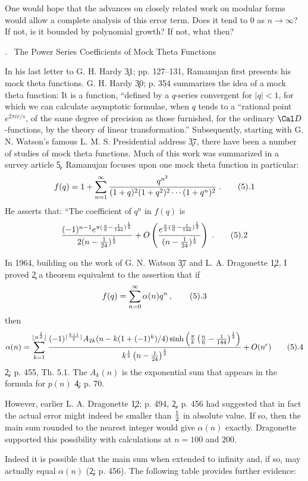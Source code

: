 One would hope that the advances on closely related work on modular
forms would allow a complete analysis of this error term.  Does it
tend to $0$ as $n \to \infty$?  If not, is it bounded by polynomial
growth?  If not, what then?

. \ The Power Series Coefficients of Mock Theta Functions
\endsubhead

In his last letter to G. H. Hardy \c{31; pp. 127--131}, Ramanujan
first presents his mock theta functions.  G. H. Hardy \c{30; p. 354}
summarizes the idea of a mock theta function: It is a function,
``defined by a $q$-series convergent for $|q| < 1$, for which we 
can calculate asymptotic formulae, when $q$ tends to a ``rational
point $e^{2\pi ir/s}$, of the same degree of precision as those
furnished, for the ordinary $\D$-functions, by the theory of linear
transformation.''  Subsequently, starting with G. N. Watson's 
famous L. M. S. Presidential address \c{37}, there have been a
number of studies of mock theta functions.  Much of this work was
summarized in a survey article \c5.  Ramanujan focuses upon one mock 
theta function in particular:
$$
	f(q) = 1 + \sum_{n=1}^{\infty} \fr{q^{n^2}}{(1 + q)^2
	(1 + q^2)^2 \cdots (1 + q^n)^2}\;.
\tag5.1
$$
He asserts that:  ``The coefficient of $q^n$ in $f(q)$ is
$$
	\fr{(-1)^{n-1} e^{\pi(\fr{n}{6} - \fr1{144})^{\fr12}}}
	{2(n - \fr1{24})^{\fr12}}  + O \left(\fr{e^{\fr{\pi}{2}
	(\fr{n}{6} - \fr1{144})^{\fr12}}}{(n - \fr1{24})^{\fr12}}
	\right)\;.
\tag5.2
$$

In 1964, building on the work of G. N. Watson \c{37} and L. A.
Dragonette \c{12}, I proved \c{2} a theorem equivalent to the 
assertion that if
$$
	f(q) = \sum_{n=0}^{\infty} \alpha(n) q^n\,,
\tag5.3
$$
then
$$
	\alpha(n) = \sum_{k=1}^{\lfloor n^{\fr12}\rfloor}
	\fr{(-1)^{\lfloor\fr{k+1}{2}\rfloor} A_{2k}(n - k(1 + (-1)^k)/4)
	\sinh \left(\fr{\pi}{k} \left(\fr{n}{6} - \fr1{144}\right)^{\fr12}
	\right)}{k^{\fr12} \left(n - \fr1{24}\right)^{\fr12}}
	+ O(n^\epsilon)
\tag5.4
$$
\c{2; p. 455, Th. 5.1}.  The $A_k(n)$ is the exponential sum that 
appears in the formula for $p(n)$ \c{4; p. 70}.

However, earlier L. A. Dragonette \c{12; p. 494}, \c{2, p. 456} had
suggested that in fact the actual error might indeed be smaller 
than $\frac12$ in absolute value.  If so, then the main sum rounded
to the nearest integer would give $\alpha(n)$ exactly.  Dragonette
supported this possibility with calculations at $n = 100$ and 
$200$.

Indeed it is possible that the main sum  when
extended to infinity and, if so, may actually equal $\alpha(n)$
(\c{2; p. 456}).  The following table provides further evidence:

